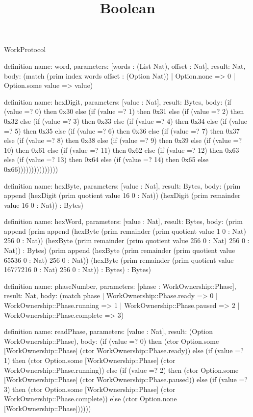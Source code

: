 \begin{lexlean}{WorkProtocol}
\title{Boolean}
\begin{semanticmodule}
definition{
  name: word,
  parameters: [words : (List Nat), offset : Nat],
  result: Nat,
  body: (match (prim index words offset : (Option Nat))
    | Option.none => 0
    | Option.some value => value)
}

definition{
  name: hexDigit,
  parameters: [value : Nat],
  result: Bytes,
  body: (if (value =? 0) then 0x30 else (if (value =? 1) then 0x31 else (if (value =? 2) then 0x32 else (if (value =? 3) then 0x33 else (if (value =? 4) then 0x34 else (if (value =? 5) then 0x35 else (if (value =? 6) then 0x36 else (if (value =? 7) then 0x37 else (if (value =? 8) then 0x38 else (if (value =? 9) then 0x39 else (if (value =? 10) then 0x61 else (if (value =? 11) then 0x62 else (if (value =? 12) then 0x63 else (if (value =? 13) then 0x64 else (if (value =? 14) then 0x65 else 0x66)))))))))))))))
}

definition{
  name: hexByte,
  parameters: [value : Nat],
  result: Bytes,
  body: (prim append (hexDigit (prim quotient value 16 0 : Nat)) (hexDigit (prim remainder value 16 0 : Nat)) : Bytes)
}

definition{
  name: hexWord,
  parameters: [value : Nat],
  result: Bytes,
  body: (prim append (prim append (hexByte (prim remainder (prim quotient value 1 0 : Nat) 256 0 : Nat)) (hexByte (prim remainder (prim quotient value 256 0 : Nat) 256 0 : Nat)) : Bytes) (prim append (hexByte (prim remainder (prim quotient value 65536 0 : Nat) 256 0 : Nat)) (hexByte (prim remainder (prim quotient value 16777216 0 : Nat) 256 0 : Nat)) : Bytes) : Bytes)
}

definition{
  name: phaseNumber,
  parameters: [phase : WorkOwnership::Phase],
  result: Nat,
  body: (match phase
    | WorkOwnership::Phase.ready => 0
    | WorkOwnership::Phase.running => 1
    | WorkOwnership::Phase.paused => 2
    | WorkOwnership::Phase.complete => 3)
}

definition{
  name: readPhase,
  parameters: [value : Nat],
  result: (Option WorkOwnership::Phase),
  body: (if (value =? 0) then (ctor Option.some [WorkOwnership::Phase] (ctor WorkOwnership::Phase.ready)) else (if (value =? 1) then (ctor Option.some [WorkOwnership::Phase] (ctor WorkOwnership::Phase.running)) else (if (value =? 2) then (ctor Option.some [WorkOwnership::Phase] (ctor WorkOwnership::Phase.paused)) else (if (value =? 3) then (ctor Option.some [WorkOwnership::Phase] (ctor WorkOwnership::Phase.complete)) else (ctor Option.none [WorkOwnership::Phase])))))
}


\end{semanticmodule}
\end{lexlean}
